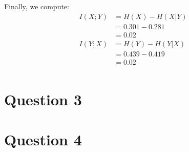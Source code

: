 \documentclass{article}
\begin{document}
Finally, we compute:
\begin{align*}
I(X;Y) &= H(X) - H(X|Y)\\
&= 0.301 - 0.281\\
&= 0.02\\
I(Y;X) &= H(Y) - H(Y|X)\\
&= 0.439 - 0.419\\
&= 0.02\\
\end{align*}
\QED
\newpage

\section{Question 3}

\newpage

\section{Question 4}





\end{document}
